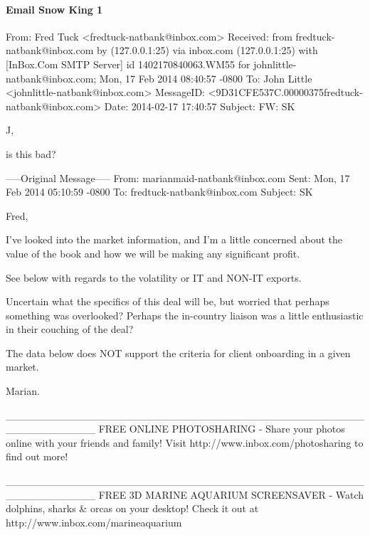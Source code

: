 \paragraph{Email Snow King 1}
\label{SnowKing1}
\begin{spverbatim}
From: Fred Tuck <fredtuck-natbank@inbox.com>
Received: from fredtuck-natbank@inbox.com by (127.0.0.1:25) via inbox.com
  (127.0.0.1:25) with [InBox.Com SMTP Server] id 1402170840063.WM55 for
  johnlittle-natbank@inbox.com; Mon, 17 Feb 2014 08:40:57 -0800
To: John Little <johnlittle-natbank@inbox.com>
MessageID: <9D31CFE537C.00000375fredtuck-natbank@inbox.com>
Date: 2014-02-17 17:40:57
Subject: FW: SK

J,

is this bad?

-----Original Message-----
From: marianmaid-natbank@inbox.com
Sent: Mon, 17 Feb 2014 05:10:59 -0800
To: fredtuck-natbank@inbox.com
Subject: SK

Fred,

I've looked into the market information, and I'm a little concerned about the value of the book and how we will be making any significant profit.

See below with regards to the volatility or IT and NON-IT exports. 

Uncertain what the specifics of this deal will be, but worried that perhaps something was overlooked? Perhaps the in-country liaison was a little enthusiastic in their couching of the deal?

The data below does NOT support the criteria for client onboarding in a given market.

Marian.

____________________________________________________________
FREE ONLINE PHOTOSHARING - Share your photos online with your friends and family!
Visit http://www.inbox.com/photosharing to find out more!

____________________________________________________________
FREE 3D MARINE AQUARIUM SCREENSAVER - Watch dolphins, sharks & orcas on your desktop!
Check it out at http://www.inbox.com/marineaquarium
\end{spverbatim}

